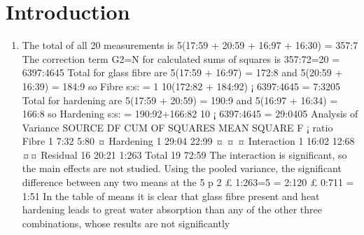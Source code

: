 \documentclass[a4paper,12pt]{article}
\begin{document}
\section{Introduction}
\begin{enumerate}
    \item The total of all 20 measurements is 5(17:59 + 20:59 + 16:97 + 16:30) = 357:7 The correction
term G2=N for calculated sums of squares is 357:72=20 = 6397:4645 Total for glass fibre are
5(17:59 + 16:97) = 172:8 and 5(20:59 + 16:39) = 184:9 so Fibre s:s: = 1
10(172:82 + 184:92) ¡
6397:4645 = 7:3205 Total for hardening are 5(17:59 + 20:59) = 190:9 and 5(16:97 + 16:34) =
166:8 so Hardening s:s: = 190:92+166:82
10 ¡ 6397:4645 = 29:0405
Analysis of Variance
SOURCE DF CUM OF SQUARES MEAN SQUARE F ¡ ratio
Fibre 1 7:32 5:80 ¤
Hardening 1 29:04 22:99 ¤ ¤ ¤
Interaction 1 16:02 12:68 ¤¤
Residual 16 20:21 1:263
Total 19 72:59
The interaction is significant, so the main effects are not studied. Using the pooled variance,
the significant difference between any two means at the 5%
p
2 £ 1:263=5 =
2:120 £ 0:711 = 1:51
In the table of means it is clear that glass fibre present and heat hardening leads to great
water absorption than any of the other three combinations, whose results are not significantly

\end{enumerate}
\end{document}
